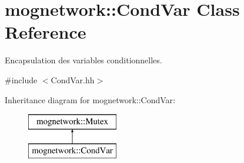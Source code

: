 \hypertarget{classmognetwork_1_1_cond_var}{\section{mognetwork\-:\-:Cond\-Var Class Reference}
\label{classmognetwork_1_1_cond_var}
}


Encapsulation des variables conditionnelles.  




{\ttfamily \#include $<$Cond\-Var.\-hh$>$}

Inheritance diagram for mognetwork\-:\-:Cond\-Var\-:\begin{figure}[H]
\begin{center}
\leavevmode
\includegraphics[height=2.000000cm]{classmognetwork_1_1_cond_var}
\end{center}
\end{figure}

